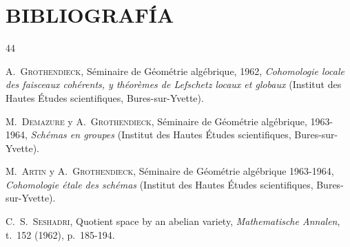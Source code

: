 \clearpage
{}
{}
\section*{BIBLIOGRAFÍA}

\begingroup
\makeatletter
\expandafter\def\csname chapter\endcsname{\@ifstar{\@gobble}{\@gobble}}
\makeatother
\begin{thebibliography}{44}

A.~\textsc{Grothendieck}, Séminaire de Géométrie algébrique, 1962,
\emph{Cohomologie locale des faisceaux cohérents, y théorèmes de Lefschetz locaux
et globaux} (Institut des Hautes Études scientifiques, Bures-sur-Yvette).

M.~\textsc{Demazure} y A.~\textsc{Grothendieck}, Séminaire de Géométrie algébrique,
1963-1964, \emph{Schémas en groupes} (Institut des Hautes Études scientifiques,
Bures-sur-Yvette).

M.~\textsc{Artin} y A.~\textsc{Grothendieck}, Séminaire de Géométrie algébrique
1963-1964, \emph{Cohomologie étale des schémas} (Institut des Hautes Études
scientifiques, Bures-sur-Yvette).

C.~S.~\textsc{Seshadri}, Quotient space by an abelian variety,
\emph{Mathematische Annalen}, t.~152 (1962), p.~185-194.

\end{thebibliography}
\endgroup
